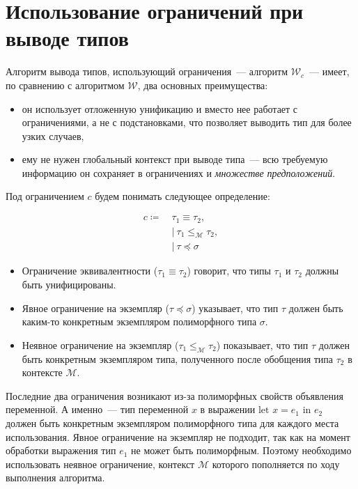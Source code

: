 \section{Использование ограничений при выводе типов}
\label{sec:constratints_usage}

Алгоритм вывода типов, использующий ограничения~--- алгоритм $\mathcal{W}_c$~--- имеет, по сравнению с алгоритмом $\mathcal{W}$, два основных преимущества:
\begin{itemize}
    \item он использует отложенную унификацию и вместо нее работает с ограничениями, а не с подстановками, что позволяет выводить тип для более узких случаев,
    \item ему не нужен глобальный контекст при выводе типа~--- всю требуемую информацию он сохраняет в ограничениях и \textit{множестве предположений}.
\end{itemize}

Под ограничением $c$ будем понимать следующее определение:

\begin{equation}
    \label{eq:cst}
    \begin{aligned}
        c \coloneqq ~ &\tau_1 \equiv \tau_2, \\
        &| ~ \tau_1 \leq_{\mathcal{M}} \tau_2, \\
        &| ~ \tau \preceq \sigma
    \end{aligned}
\end{equation}

\begin{itemize}
    \item Ограничение эквивалентности ($\tau_1 \equiv \tau_2$) говорит, что типы $\tau_1$ и $\tau_2$ должны быть унифицированы.
    \item Явное ограничение на экземпляр ($\tau \preceq \sigma$) указывает, что тип $\tau$ должен быть каким-то конкретным экземпляром полиморфного типа $\sigma$.
    \item Неявное ограничение на экземпляр ($\tau_1 \leq_{\mathcal{M}} \tau_2$) показывает, что тип $\tau$ должен быть конкретным экземпляром типа, полученного после обобщения типа $\tau_2$ в контексте $\mathcal{M}$.
\end{itemize}

Последние два ограничения возникают из-за полиморфных свойств объявления переменной.
А именно~--- тип переменной $x$ в выражении $\text{let } x = e_1 \text{ in } e_2$ должен быть конкретным экземпляром полиморфного типа для каждого места использования.
Явное ограничение на экземпляр не подходит, так как на момент обработки выражения тип $e_1$ не может быть полиморфным.
Поэтому необходимо использовать неявное ограничение, контекст $\mathcal{M}$ которого пополняется по ходу выполнения алгоритма.

